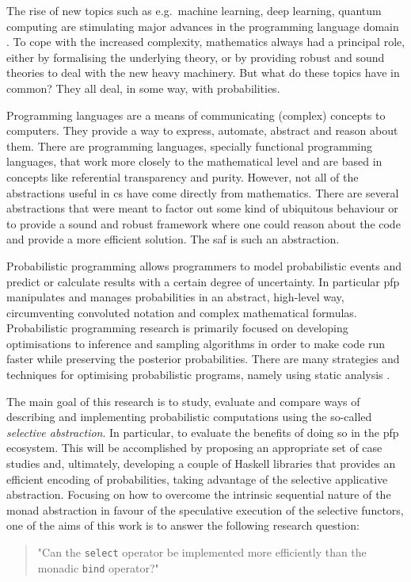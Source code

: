\documentclass[
  oneside,
  11pt, a4paper,
  footinclude=true,
  headinclude=true,
  cleardoublepage=empty
]{scrbook}
\theoremstyle{definition}
\theoremstyle{definition}
\begin{document}
    The rise of new topics such as e.g.\ machine learning, deep learning, quantum computing are stimulating major advances in the programming language domain \citep{selinger2004brief, innes2018machine}. To cope with the increased complexity, mathematics always had a principal role, either by formalising the underlying theory, or by providing robust and sound theories to deal with the new heavy machinery. But what do these topics have in common? They all deal, in some way, with probabilities. 
	    
	Programming languages are a means of communicating (complex) concepts to computers. They provide a way to express, automate, abstract and reason about them. There are programming languages, specially functional programming languages, that work more closely to the mathematical level and are based in concepts like referential transparency and purity. However, not all of the abstractions useful in \gls{cs} have come directly from mathematics. There are several abstractions that were meant to factor out some kind of ubiquitous behaviour or to provide a sound and robust framework where one could reason about the code and provide a more efficient solution. The \gls{saf} is such an abstraction.
	    
	Probabilistic programming allows programmers to model probabilistic events and predict or calculate results with a certain degree of uncertainty. In particular \gls{pfp} manipulates and manages probabilities in an abstract, high-level way, circumventing convoluted notation and complex mathematical formulas. Probabilistic programming research is primarily focused on developing optimisations to inference and sampling algorithms in order to make code run faster while preserving the posterior probabilities. There are many strategies and techniques for optimising probabilistic programs, namely using static analysis \citep{bernstein2019static}.
    
    The main goal of this research is to study, evaluate and compare ways of describing and implementing probabilistic computations using the so-called \emph{selective abstraction}. In particular, to evaluate the benefits of doing so in the \gls{pfp} ecosystem. This will be accomplished by proposing an appropriate set of case studies and, ultimately, developing a couple of Haskell libraries that provides an efficient encoding of probabilities, taking advantage of the selective applicative abstraction. Focusing on how to overcome the intrinsic sequential nature of the monad abstraction \citep{Scibior:2015:PPP:2887747.2804317} in favour of the speculative execution of the selective functors, one of the aims of this work is to answer the following research question:
        \begin{quote}
        "Can the \texttt{select} operator be implemented more efficiently than the monadic \texttt{bind} operator?"
        \end{quote}
\end{document}
